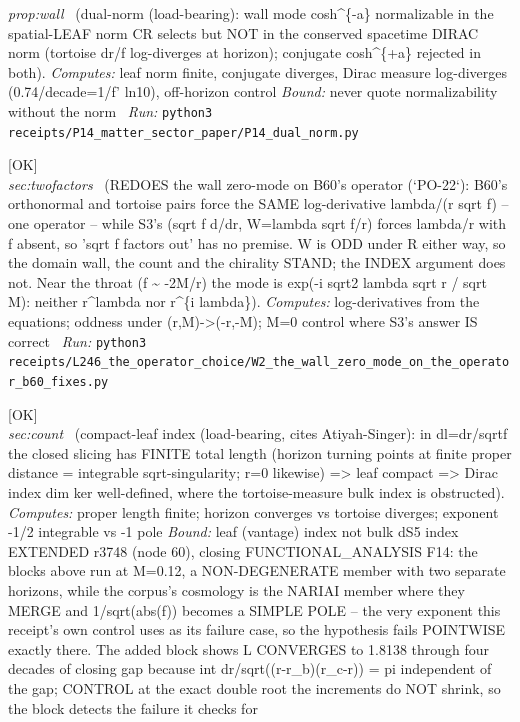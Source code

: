 \begin{description}
\textit{prop:wall} \ (dual-norm (load-bearing): wall mode cosh\textasciicircum{}\{-a\} normalizable in the spatial-LEAF norm CR selects but NOT in the conserved spacetime DIRAC norm (tortoise dr/f log-diverges at horizon); conjugate cosh\textasciicircum{}\{+a\} rejected in both). 
\emph{Computes:} leaf norm finite, conjugate diverges, Dirac measure log-diverges (0.74/decade=1/f' ln10), off-horizon control
 \emph{Bound:} never quote normalizability without the norm
\ \emph{Run:} \texttt{python3 receipts/P14\_matter\_sector\_paper/P14\_dual\_norm.py}
\item[\label{rcpt:W2_the_wall_zero_mode_on_the_operator_b60_fixes}\textbf{}\quad\texttt{W2\_the\_wall\_zero\_mode\_on\_the\_operator\_b60\_fixes}]\hfill\textsf{[OK]}\\
\textit{sec:twofactors} \ (REDOES the wall zero-mode on B60's operator (`PO-22`): B60's orthonormal and tortoise pairs force the SAME log-derivative lambda/(r sqrt f) -- one operator -- while S3's (sqrt f d/dr, W=lambda sqrt f/r) forces lambda/r with f absent, so 'sqrt f factors out' has no premise. W is ODD under R either way, so the domain wall, the count and the chirality STAND; the INDEX argument does not. Near the throat (f \textasciitilde{} -2M/r) the mode is exp(-i sqrt2 lambda sqrt r / sqrt M): neither r\textasciicircum{}lambda nor r\textasciicircum{}\{i lambda\}). 
\emph{Computes:} log-derivatives from the equations; oddness under (r,M)->(-r,-M); M=0 control where S3's answer IS correct
\ \emph{Run:} \texttt{python3 receipts/L246\_the\_operator\_choice/W2\_the\_wall\_zero\_mode\_on\_the\_operator\_b60\_fixes.py}
\item[\rcptlabel{P14_leaf_compactness}{P14R10}\textbf{P14R10}\quad\texttt{P14\_leaf\_compactness}]\hfill\textsf{[OK]}\\
\textit{sec:count} \ (compact-leaf index (load-bearing, cites Atiyah-Singer): in dl=dr/sqrt\textbar{}f\textbar{} the closed slicing has FINITE total length (horizon turning points at finite proper distance = integrable sqrt-singularity; r=0 likewise) => leaf compact => Dirac index dim ker well-defined, where the tortoise-measure bulk index is obstructed). 
\emph{Computes:} proper length finite; horizon converges vs tortoise diverges; exponent -1/2 integrable vs -1 pole
 \emph{Bound:} leaf (vantage) index not bulk dS5 index EXTENDED r3748 (node 60), closing FUNCTIONAL\_ANALYSIS F14: the blocks above run at M=0.12, a NON-DEGENERATE member with two separate horizons, while the corpus's cosmology is the NARIAI member where they MERGE and 1/sqrt(abs(f)) becomes a SIMPLE POLE -- the very exponent this receipt's own control uses as its failure case, so the hypothesis fails POINTWISE exactly there. The added block shows L CONVERGES to 1.8138 through four decades of closing gap because int dr/sqrt((r-r\_b)(r\_c-r)) = pi independent of the gap; CONTROL at the exact double root the increments do NOT shrink, so the block detects the failure it checks for

\end{description}
